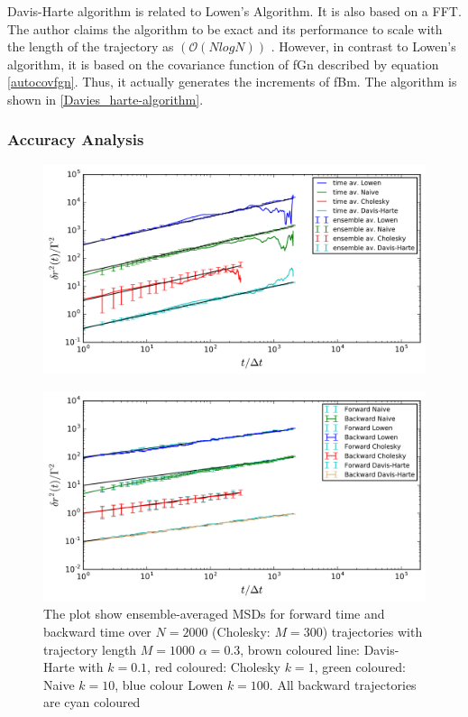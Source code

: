 \documentclass[
  a4paper,BCOR10mm,oneside,
  headsepline,footsepline,%
  fleqn,openbib
]{scrbook}
\begin{document}
Davis-Harte algorithm \cite{DAVIES1987} is related to Lowen's Algorithm. It is also based on a FFT. The author claims the algorithm to be exact and its performance to scale with the length of the trajectory as $(\mathcal{O}(NlogN))$ . However, in contrast to Lowen's algorithm, it is based on the covariance function of fGn described by equation \cref{autocovfgn}. Thus, it actually generates the increments of fBm. The  algorithm is shown in \cref{Davies_harte-algorithm}. 
\subsubsection{Accuracy Analysis}
\begin{figure}[h!]
  \centering
  \includegraphics[width=\textwidth]{./data/timevsensambenew.png}
  \captionsetup{width=\linewidth}
  \label{fig:4}
\end{figure}
\begin{figure}[h!]
\centering
\includegraphics[width=\textwidth]{./data/changeintimenew.png}
\caption{The plot show ensemble-averaged MSDs for forward time and backward time over $N=2000$ (Cholesky: $M=300$) trajectories with trajectory length $M=1000$  $\alpha =0.3$,  brown coloured line: Davis-Harte with $k=0.1$, red coloured: Cholesky $k=1$, green coloured: Naive $k=10$, blue colour Lowen $k=100$. All backward trajectories are cyan coloured}
\label{changeintime}
\end{figure} 
\end{document}

